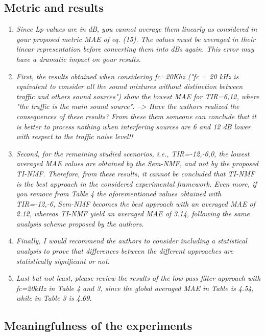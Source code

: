 \documentclass[10pt]{article}
\begin{document}
\subsection{Metric and results}

\begin{enumerate}
\item \emph{Since Lp values are in dB, you cannot average them linearly as considered in your proposed metric MAE of eq. (15). The values must be averaged in their linear representation before converting them into dBs again. This error may have a dramatic impact on your results.}

\item \emph{First, the results obtained when considering fc=20Khz ("fc = 20 kHz is equivalent to consider all the sound mixtures without distinction between traffic and others sound sources") show the lowest MAE for TIR={6,12}, where "the traffic is the main sound source". 
--> Have the authors realized the consequences of these results? From these them someone can conclude that it is better to process nothing when interfering sources are 6 and 12 dB lower with respect to the traffic noise level!!}

\item \emph{Second, for the remaining studied scenarios, i.e., TIR={-12,-6,0}, the lowest averaged MAE values are obtained by the Sem-NMF, and not by the proposed TI-NMF.
Therefore, from these results, it cannot be concluded that TI-NMF is the best approach in the considered experimental framework. Even more, if you remove from Table 4 the aforementioned values obtained with TIR={-12,-6}, Sem-NMF becomes the best approach with an averaged MAE of 2.12, whereas TI-NMF yield an averaged MAE of 3.14, following the same analysis scheme proposed by the authors.}

\item \emph{Finally, I would recommend the authors to consider including a statistical analysis to prove that differences between the different approaches are statistically significant or not.}

\item \emph{Last but not least, please review the results of the low pass filter approach with fc=20kHz in Table 4 and 3, since the global averaged MAE in Table is 4.54, while in Table 3 is 4.69.}

\end{enumerate}

\subsection{Meaningfulness of the experiments}
\end{document}
